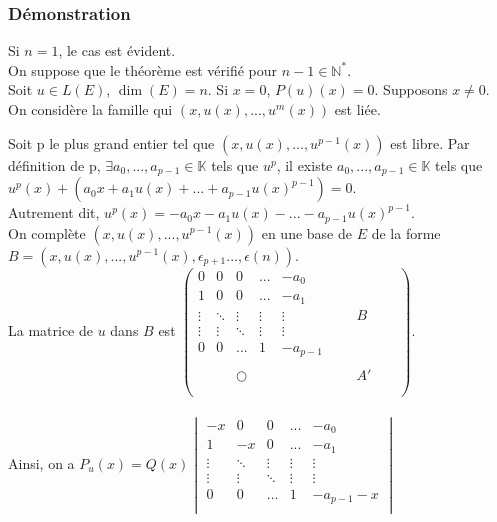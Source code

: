 \documentclass[a4paper,10pt]{book} %
\newcommand{\N}{\mathbb{N}}
\newcommand{\K}{\mathbb{K}}
\begin{document}
\subsubsection{Démonstration}
Si $n=1$, le cas est évident.\\

On suppose que le théorème est vérifié pour $n-1\in \N^*$.\\

Soit $u\in L(E)$, $\dim(E)=n$. Si $x=0$, $P(u)(x)=0$. Supposons $x\neq 0$.\\

On considère la famille qui $(x,u(x),...,u^m(x))$ est liée.

Soit p le plus grand entier tel que $(x,u(x),...,u^{p-1}(x))$ est libre. Par définition de p, $\exists a_0,...,a_{p-1} \in\K$ tels que $u^p$, il existe $a_0,...,a_{p-1}\in \K$ tels que $u^p(x)+(a_0x+a_1u(x)+...+a_{p-1}u(x)^{p-1})=0$.\\

Autrement dit, $u^p(x)=-a_0x-a_1u(x)-...-a_{p-1} u(x)^{p-1}$.\\

On complète $(x,u(x),...,u^{p-1}(x))$ en une base de $E$ de la forme $B=(x,u(x),...,u^{p-1}(x), \epsilon_{p+1}...,\epsilon(n))$.\\

La matrice de $u$ dans $B$ est
$\begin{pmatrix}
0&0&0&...&-a_0& & & & &\\
1&0&0&...&-a_{1}\\
\vdots&\ddots&\vdots&\vdots&\vdots& & &B\\
\vdots&\vdots&\ddots&\vdots&\vdots\\
0&0&...&1&-a_{p-1}\\
\\
& &\bigcirc& & & & &A'\\
\\
\end{pmatrix}$.\\\\

Ainsi, on a
$P_u(x)=Q(x)\begin{vmatrix}
-x&0&0&...&-a_0\\
1&-x&0&...&-a_{1}\\
\vdots&\ddots&\vdots&\vdots&\vdots\\
\vdots&\vdots&\ddots&\vdots&\vdots\\
0&0&...&1&-a_{p-1}-x\\
\end{vmatrix}$\\\\
\end{document}
